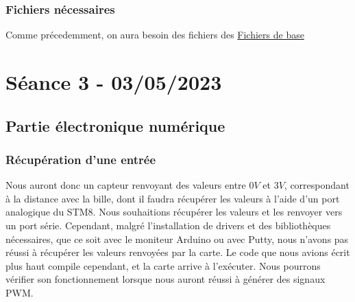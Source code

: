 \documentclass[11pt,a4paper]{article}
\begin{document}
\subsubsection{Fichiers nécessaires}
Comme précedemment, on aura besoin des fichiers des \href{https://github.com/CircuitDigest/STM8S103F3_SPL}{Fichiers de base}

\section{Séance 3 - 03/05/2023}
\subsection{Partie électronique numérique}
\subsubsection{Récupération d'une entrée}
Nous auront donc un capteur renvoyant des valeurs entre $0V$ et $3V$, correspondant à la distance avec la bille, dont il faudra récupérer les valeurs à l'aide d'un port analogique du STM8. Nous souhaitions récupérer les valeurs et les renvoyer vers un port série. Cependant, malgré l'installation de drivers et des bibliothèques nécessaires, que ce soit avec le moniteur Arduino ou avec Putty, nous n'avons pas réussi à récupérer les valeurs renvoyées par la carte. Le code que nous avions écrit plus haut compile cependant, et la carte arrive à l'exécuter. Nous pourrons vérifier son fonctionnement lorsque nous auront réussi à générer des signaux PWM.
\end{document}
